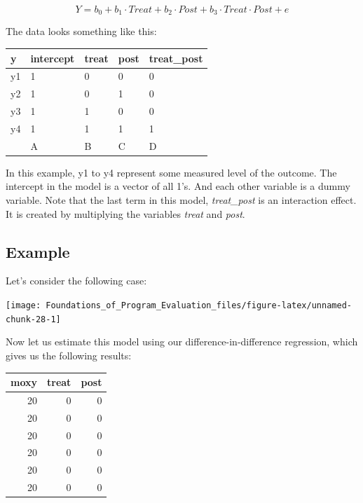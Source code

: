 \documentclass[]{book}
\theoremstyle{definition}
\theoremstyle{definition}
\theoremstyle{definition}
\theoremstyle{remark}
\begin{document}
\[ Y = b_{0} + b_{1} \cdot Treat + b_{2} \cdot Post + b_{3} \cdot Treat \cdot Post + e \]

The data looks something like this:

\begin{tabular}{l|l|l|l|l}
\hline
y & intercept & treat & post & treat\_post\\
\hline
y1 & 1 & 0 & 0 & 0\\
\hline
y2 & 1 & 0 & 1 & 0\\
\hline
y3 & 1 & 1 & 0 & 0\\
\hline
y4 & 1 & 1 & 1 & 1\\
\hline
 & A & B & C & D\\
\hline
\end{tabular}

In this example, y1 to y4 represent some measured level of the outcome.
The intercept in the model is a vector of all 1's. And each other
variable is a dummy variable. Note that the last term in this model,
\emph{treat\_post} is an interaction effect. It is created by
multiplying the variables \emph{treat} and \emph{post}.

\hypertarget{example-1}{%
\subsection{Example}\label{example-1}}

Let's consider the following case:

\begin{center}\texttt{[image: Foundations\_of\_Program\_Evaluation\_files/figure-latex/unnamed-chunk-28-1]} \end{center}

Now let us estimate this model using our difference-in-difference
regression, which gives us the following results:

\begin{tabular}{r|r|r}
\hline
moxy & treat & post\\
\hline
20 & 0 & 0\\
\hline
20 & 0 & 0\\
\hline
20 & 0 & 0\\
\hline
20 & 0 & 0\\
\hline
20 & 0 & 0\\
\hline
20 & 0 & 0\\
\hline
\end{tabular}
\end{document}
